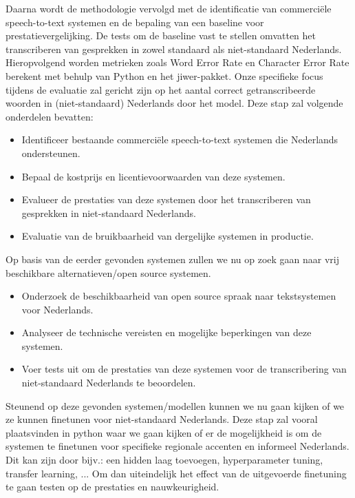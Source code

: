 \par Daarna wordt de methodologie vervolgd met de identificatie van commerciële speech-to-text systemen en de bepaling van een baseline voor prestatievergelijking. De tests om de baseline vast te stellen omvatten het transcriberen van gesprekken in zowel standaard als niet-standaard Nederlands. Hieropvolgend worden metrieken zoals Word Error Rate en Character Error Rate berekent met behulp van Python en het jiwer-pakket. Onze specifieke focus tijdens de evaluatie zal gericht zijn op het aantal correct getranscribeerde woorden in (niet-standaard) Nederlands door het model.
Deze stap zal volgende onderdelen bevatten:
\begin{itemize}
    \item Identificeer bestaande commerciële speech-to-text systemen die Nederlands ondersteunen.
    \item Bepaal de kostprijs en licentievoorwaarden van deze systemen.
    \item Evalueer de prestaties van deze systemen door het transcriberen van gesprekken in niet-standaard Nederlands.
    \item Evaluatie van de bruikbaarheid van dergelijke systemen in productie.
\end{itemize}   
\par Op basis van de eerder gevonden systemen zullen we nu op zoek gaan naar vrij beschikbare alternatieven/open source systemen.
\begin{itemize}
    \item Onderzoek de beschikbaarheid van open source spraak naar tekstsystemen voor Nederlands.
    \item Analyseer de technische vereisten en mogelijke beperkingen van deze systemen.
    \item Voer tests uit om de prestaties van deze systemen voor de transcribering van niet-standaard Nederlands te beoordelen.
\end{itemize}
\par Steunend op deze gevonden systemen/modellen kunnen we nu gaan kijken of we ze kunnen finetunen voor niet-standaard Nederlands. Deze stap zal vooral plaatsvinden in python waar we gaan kijken of er de mogelijkheid is om de systemen te finetunen voor specifieke regionale accenten en informeel Nederlands. Dit kan zijn door bijv.: een hidden laag toevoegen, hyperparameter tuning, transfer learning, ... Om dan uiteindelijk het effect van de uitgevoerde finetuning te gaan testen op de prestaties en nauwkeurigheid.

